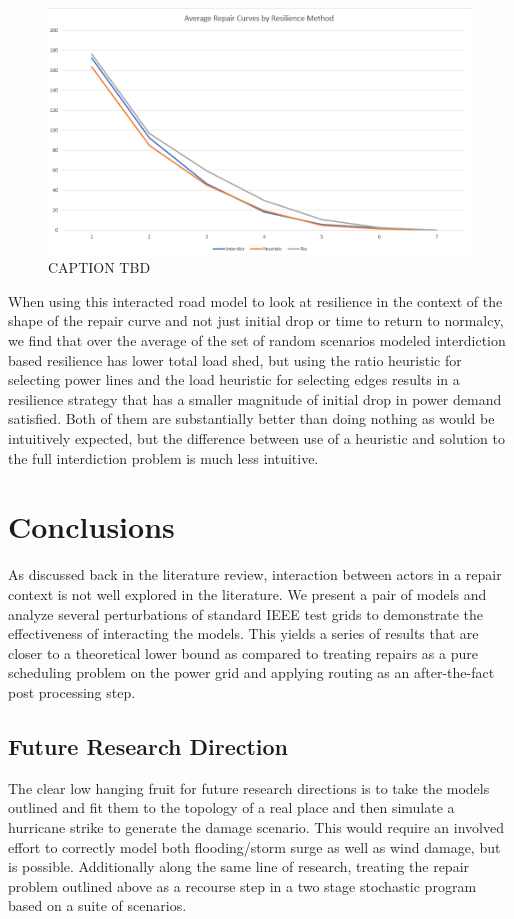 \documentclass{article}
\begin{document}
	\begin{figure}[htbp]
		\centering
		\includegraphics[width=.9\linewidth]{AverageSpaghetti.png}
		\caption{CAPTION TBD}
	\end{figure}

	When using this interacted road model to look at resilience in the context of the shape of the repair curve and not just initial drop or time to return to normalcy, we find that over the average of the set of random scenarios modeled interdiction based resilience has lower total load shed, but using the ratio heuristic for selecting power lines and the load heuristic for selecting edges results in a resilience strategy that has a smaller magnitude of initial drop in power demand satisfied. Both of them are substantially better than doing nothing as would be intuitively expected, but the difference between use of a heuristic and solution to the full interdiction problem is much less intuitive.


	\section{Conclusions}
	
	As discussed back in the literature review, interaction between actors in a repair context is not well explored in the literature. We present a pair of models and analyze several perturbations of standard IEEE test grids to demonstrate the effectiveness of interacting the models. This yields a series of results that are closer to a theoretical lower bound as compared to treating repairs as a pure scheduling problem on the power grid and applying routing as an after-the-fact post processing step.
	

	\subsection{Future Research Direction}
	The clear low hanging fruit for future research directions is to take the models outlined and fit them to the topology of a real place and then simulate a hurricane strike to generate the damage scenario. This would require an involved effort to correctly model both flooding/storm surge as well as wind damage, but is possible. Additionally along the same line of research, treating the repair problem outlined above as a recourse step in a two stage stochastic program based on a suite of scenarios.
	
\end{document}
